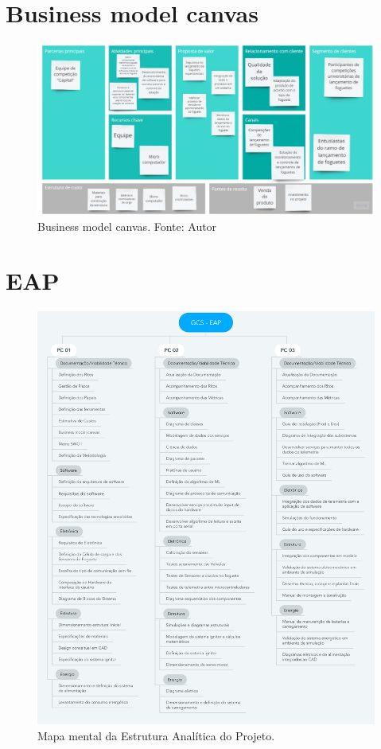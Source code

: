 \begin{apendicesenv}
\chapter{Business model canvas}
\label{canvas}
\begin{figure}[htb]
    \centering
    \includegraphics[width=1.3\textwidth , angle=90]{figuras/Canvas PI2.pdf}
    \caption{Business model canvas. Fonte: Autor}
    \label{fig:Canvas}
\end{figure}

\chapter{EAP}
\label{eap}
\begin{figure}[htb]
    \centering
    \includegraphics[width=1\textwidth ]{figuras/GCS_-_EAP.png}
    \caption{Mapa mental da Estrutura Analítica do Projeto.}
    \label{fig:EAP}
\end{figure}


\end{apendicesenv}
